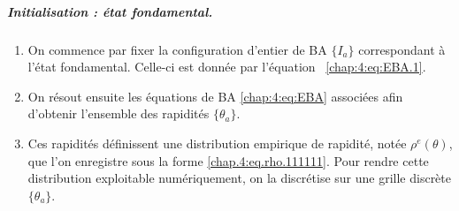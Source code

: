 
\subparagraph{Initialisation : état fondamental.}

\begin{enumerate}%
    \item On commence par fixer la configuration d'entier de \gls{BA}  \( \{I_a\} \) correspondant à l’état fondamental. Celle-ci est donnée par l'équation ~\eqref{chap:4:eq:EBA.1}.

    \item On résout ensuite les équations de \gls{BA} \eqref{chap:4:eq:EBA} associées afin d'obtenir l’ensemble des rapidités \( \{ \theta_a \} \).

	\item Ces rapidités définissent une distribution empirique de rapidité, notée \( \rho^e(\theta) \), que l’on enregistre sous la forme \eqref{chap.4:eq.rho.111111}.
	Pour rendre cette distribution exploitable numériquement, on la discrétise sur une grille discrète \( \{ \theta_a \} \).
\end{enumerate}

